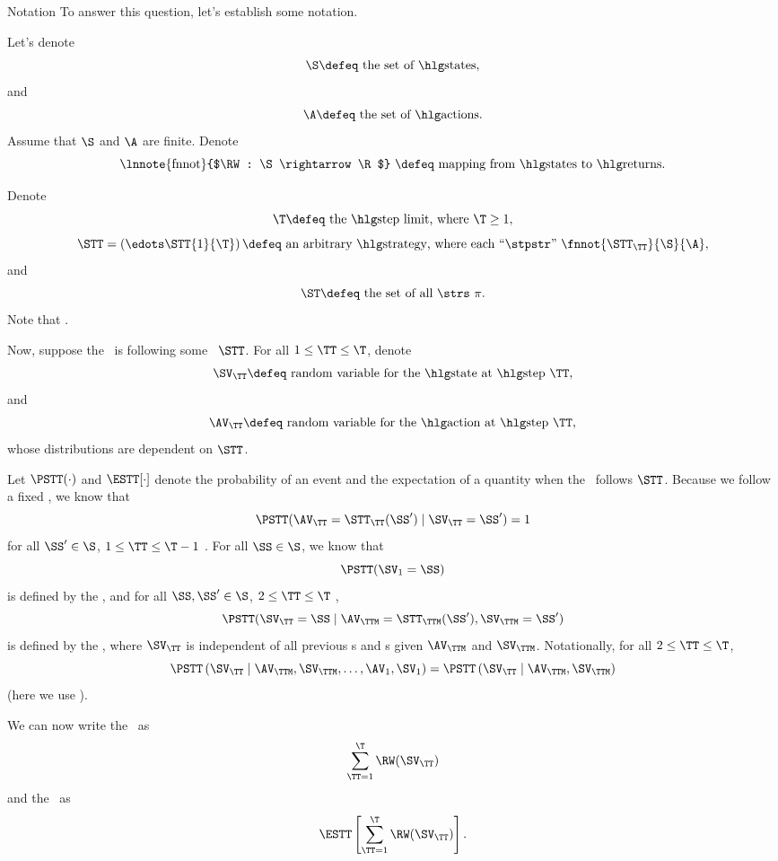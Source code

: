 \begin{part}{Notation}
  To answer this question, let's establish some notation.

  Let's denote
  $$\text{$\S \defeq$ the set of \til{}s},$$
  and 
  $$\text{$\A \defeq$ the set of \act{}s.}$$
  Assume that $\S$ and $\A$ are finite.
  Denote
  $$\text{\lnnote{fnnot}{$\RW : \S \rightarrow \R$} $\defeq$ mapping from \til{}s to \rwd{}s.}$$

  Denote
  $$\text{$\T \defeq$ the \lmt, where $\T \ge 1$},$$
  $$\text{$\STT = \left(\edots\STT{1}{\T}\right) \defeq$ an arbitrary \str, 
  where each ``\stpstr'' {$\fnnot{\STT_\TT}{\S}{\A}$}},$$
  and
  $$\text{$\ST \defeq$ the set of all \strs\ $\pi$}.$$
  Note that .

  Now, suppose the \agt\ is following some \str\ $\STT$.
  For all $1 \le \TT \le \T$,
  denote
  $$\text{$\SV_\TT \defeq$ random variable for the \til\ at \stp\ $\TT$},$$
  and
  $$\text{$\AV_\TT \defeq$ random variable for the \act\ at \stp\ $\TT$},$$
  whose distributions are dependent on $\STT$.

  Let $\PSTT(\cdot)$ and $\ESTT[\cdot]$ denote the probability of an event
  and the expectation of a quantity
  when the \agt\ follows $\STT$.
  Because we follow a fixed \str, we know that
  $$\PSTT(\AV_\TT = \STT_\TT(\SS') \mid \SV_\TT = \SS') = 1$$
  for all
  $\SS' \in \S$, $1 \le \TT \le \T - 1$
  .
  For all $\SS \in \S$, we know that
  $$\PSTT(\SV_1 = \SS)$$
  is defined by the \ind, and
  for all $\SS, \SS' \in \S$, $2 \le \TT \le \T$ 
  ,
  $$\PSTT(\SV_\TT = \SS \mid \AV_\TTM = \STT_\TTM(\SS'), \SV_\TTM = \SS')$$
  is defined by the \trd, where 
  $\SV_\TT$ is independent of all previous \til{}s and \act{}s given $\AV_\TTM$ and $\SV_\TTM$.
  Notationally, for all $2 \le \TT \le \T$,
  $$ 
  \PSTT\left( \SV_\TT \mid \AV_{\TTM}, \SV_{\TTM}, \ldots, \AV_{1}, \SV_{1} \right)
  = 
  \PSTT\left( \SV_\TT \mid \AV_{\TTM}, \SV_{\TTM}\right)
  $$
  (here we use ).

  We can now write the \trwd\ as
  $$\sum_{\TT = 1}^\T \RW(\SV_\TT)$$
  and the \atrwd\ as
  $$\ESTT\left[\sum_{\TT = 1}^\T \RW(\SV_\TT)\right].$$
\end{part}

